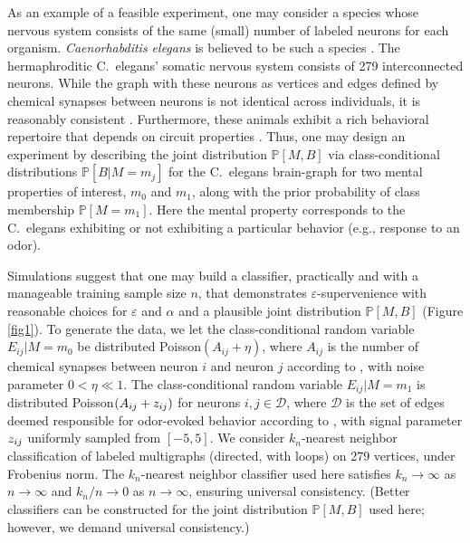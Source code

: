\documentclass{article}
\newcommand{\mD}{\mathcal{D}}
\newcommand{\PP}{\mathbb{P}}           %
\providecommand{\tr}[1]{\textcolor{black}{#1}}
\begin{document}
As an example of a feasible experiment, one may consider a species whose nervous system consists of the same (small) number of labeled neurons for each organism. {\it Caenorhabditis elegans} is believed to be such a species \cite{Durbin87}. The hermaphroditic C.~elegans' somatic nervous system consists of 279 interconnected neurons. While the graph with these neurons as vertices and edges defined by chemical synapses between neurons is not identical across individuals, it is reasonably consistent \cite{Durbin87}. Furthermore, these animals exhibit a rich behavioral repertoire that depends on circuit properties \cite{deBonoMaricq05}. Thus, one may design an experiment by describing the joint distribution $\PP[M,B]$ via class-conditional distributions $\PP[B|M=m_j]$ for the C.~elegans brain-graph for two mental properties of interest, $m_0$ and $m_1$, along with the prior probability of class membership $\PP[M=m_1]$. Here the mental property corresponds to the C.~elegans exhibiting or not exhibiting a particular behavior (e.g., response to an odor).

Simulations suggest that one may build a classifier, practically and with a manageable training sample size $n$, that demonstrates $\varepsilon$-supervenience with reasonable choices for $\varepsilon$ and $\alpha$ and a plausible joint distribution $\PP[M,B]$ (Figure \ref{fig1}). To generate the data, we let the class-conditional random variable $E_{ij} | M=m_0$ be distributed Poisson$(A_{ij}+\eta)$, where $A_{ij}$ is the number of chemical synapses between neuron $i$ and neuron $j$ according to \cite{VarshneyChklovskii09}, with noise parameter $0<\eta \ll 1$. The class-conditional random variable $E_{ij} | M=m_1$ is distributed Poisson$(A_{ij}+ \tr{z_{ij}})$ for neurons $i,j \in \mD$, where $\mD$ is the set of edges deemed responsible for odor-evoked behavior according to \cite{ChalasaniBargmann07}, with signal parameter $\tr{z_{ij}}$ uniformly sampled from $[-5,5]$. We consider $k_n$-nearest neighbor classification of labeled multigraphs (directed, with loops) on 279 vertices, under Frobenius norm. The $k_n$-nearest neighbor classifier used here satisfies $k_n \rightarrow \infty$ as $n \rightarrow \infty$ and $k_n/n \rightarrow 0$ as $n \rightarrow \infty$, ensuring universal consistency. (Better classifiers can be constructed for the joint distribution $\PP[M,B]$ used here; however, we demand universal consistency.)
\end{document}
